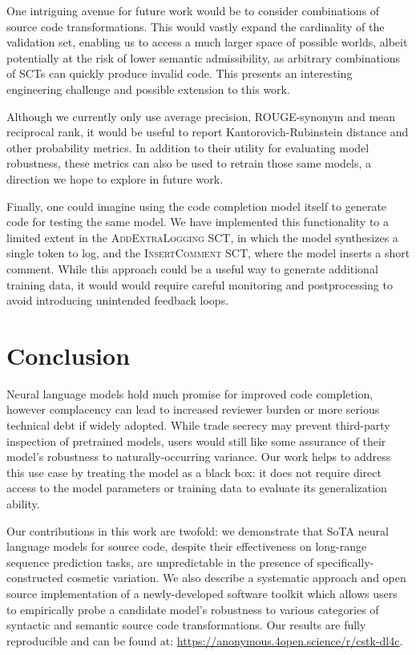 \documentclass[usenames,dvipsnames]{article} %
\begin{document}
  One intriguing avenue for future work would be to consider combinations of source code transformations. This would vastly expand the cardinality of the validation set, enabling us to access a much larger space of possible worlds, albeit potentially at the risk of lower semantic admissibility, as arbitrary combinations of SCTs can quickly produce invalid code. This presents an interesting engineering challenge and possible extension to this work.

  Although we currently only use average precision, ROUGE-synonym and mean reciprocal rank, it would be useful to report Kantorovich-Rubinstein distance and other probability metrics. In addition to their utility for evaluating model robustness, these metrics can also be used to retrain those same models, a direction we hope to explore in future work.

  Finally, one could imagine using the code completion model itself to generate code for testing the same model. We have implemented this functionality to a limited extent in the \textsc{AddExtraLogging} SCT, in which the model synthesizes a single token to log, and the \textsc{InsertComment} SCT, where the model inserts a short comment. While this approach could be a useful way to generate additional training data, it would would require careful monitoring and postprocessing to avoid introducing unintended feedback loops.

  \section{Conclusion}\label{sec:conclusion}

  Neural language models hold much promise for improved code completion, however complacency can lead to increased reviewer burden or more serious technical debt if widely adopted. While trade secrecy may prevent third-party inspection of pretrained models, users would still like some assurance of their model's robustness to naturally-occurring variance. Our work helps to address this use case by treating the model as a black box: it does not require direct access to the model parameters or training data to evaluate its generalization ability.

  Our contributions in this work are twofold: we demonstrate that SoTA neural language models for source code, despite their effectiveness on long-range sequence prediction tasks, are unpredictable in the presence of specifically-constructed cosmetic variation. We also describe a systematic approach and open source implementation of a newly-developed software toolkit which allows users to empirically probe a candidate model's robustness to various categories of syntactic and semantic source code transformations. Our results are fully reproducible and can be found at: \url{https://anonymous.4open.science/r/cstk-dl4c}.
\end{document}
